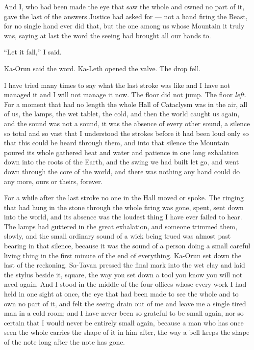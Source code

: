 And I, who had been made the eye that saw the whole and owned no part of it, gave the last of the answers Justice had asked for --- not a hand firing the Beast, for no single hand ever did that, but the one among us whose Mountain it truly was, saying at last the word the seeing had brought all our hands to.\par

``Let it fall,'' I said.\par

Ka-Orun said the word. Ka-Leth opened the valve. The drop fell.\par

\ornament

I have tried many times to say what the last stroke was like and I have not managed it and I will not manage it now. The floor did not jump. The floor \emph{left}. For a moment that had no length the whole Hall of Cataclysm was in the air, all of us, the lamps, the wet tablet, the cold, and then the world caught us again, and the sound was not a sound, it was the absence of every other sound, a silence so total and so vast that I understood the strokes before it had been loud only so that this could be heard through them, and into that silence the Mountain poured its whole gathered heat and water and patience in one long exhalation down into the roots of the Earth, and the swing we had built let go, and went down through the core of the world, and there was nothing any hand could do any more, ours or theirs, forever.\par

For a while after the last stroke no one in the Hall moved or spoke. The ringing that had hung in the stone through the whole firing was gone, spent, sent down into the world, and its absence was the loudest thing I have ever failed to hear. The lamps had guttered in the great exhalation, and someone trimmed them, slowly, and the small ordinary sound of a wick being trued was almost past bearing in that silence, because it was the sound of a person doing a small careful living thing in the first minute of the end of everything. Ka-Orun set down the last of the reckoning. Sa-Tavan pressed the final mark into the wet clay and laid the stylus beside it, square, the way you set down a tool you know you will not need again. And I stood in the middle of the four offices whose every work I had held in one sight at once, the eye that had been made to see the whole and to own no part of it, and felt the seeing drain out of me and leave me a single tired man in a cold room; and I have never been so grateful to be small again, nor so certain that I would never be entirely small again, because a man who has once seen the whole carries the shape of it in him after, the way a bell keeps the shape of the note long after the note has gone.\par

